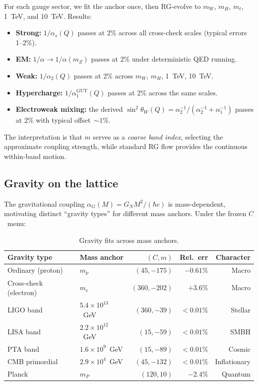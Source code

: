 \documentclass[12pt,a4paper]{article}
\newcommand{\mZ}{m_Z}
\begin{document}
For each gauge sector, we fit the anchor once, then RG-evolve to $m_W$,
$m_H$, $m_t$, 1~TeV, and 10~TeV.  Results:

\begin{itemize}[nosep]
  \item \textbf{Strong:} $1/\alpha_s(Q)$ passes at 2\% across all
    cross-check scales (typical errors 1--2\%).
  \item \textbf{EM:} $1/\alpha \to 1/\alpha(\mZ)$ passes at 2\% under
    deterministic QED running.
  \item \textbf{Weak:} $1/\alpha_2(Q)$ passes at 2\% across $m_W$, $m_H$,
    1~TeV, 10~TeV.
  \item \textbf{Hypercharge:} $1/\alpha_1^{\mathrm{GUT}}(Q)$ passes at 2\%
    across the same scales.
  \item \textbf{Electroweak mixing:} the derived
    $\sin^2\theta_W(Q) = \alpha_2^{-1}/(\alpha_2^{-1} + \alpha_1^{-1})$
    passes at 2\% with typical offset~$\sim\!1\%$.
\end{itemize}

The interpretation is that $m$ serves as a \emph{coarse band index},
selecting the approximate coupling strength, while standard RG flow provides
the continuous within-band motion.

\subsection{Gravity on the lattice}
\label{sec:gravity}

The gravitational coupling $\alpha_G(M) = G_N M^2/(\hbar c)$ is
mass-dependent, motivating distinct ``gravity types'' for different mass
anchors.  Under the frozen $C$~menu:

\begin{table}[H]
\centering
\caption{Gravity fits across mass anchors.}
\label{tab:gravity}
\begin{tabular}{@{}llrrr@{}}
\toprule
Gravity type & Mass anchor & $(C, m)$ & Rel.~err & Character \\
\midrule
Ordinary (proton)  & $m_p$                   & $(45, -175)$  & $-0.61\%$ & Macro \\
Cross-check (electron) & $m_e$               & $(360, -202)$ & $+3.6\%$  & Macro \\
LIGO band          & $5.4\times 10^{13}$~GeV & $(360, -39)$  & $<0.01\%$ & Stellar \\
LISA band          & $2.2\times 10^{12}$~GeV & $(15, -59)$   & $<0.01\%$ & SMBH \\
PTA band           & $1.6\times 10^{9}$~GeV  & $(15, -89)$   & $<0.01\%$ & Cosmic \\
CMB primordial     & $2.9\times 10^{4}$~GeV  & $(45, -132)$  & $<0.01\%$ & Inflationary \\
Planck             & $m_P$                   & $(120, 10)$   & $-2.4\%$  & Quantum \\
\bottomrule
\end{tabular}
\end{table}
\end{document}
